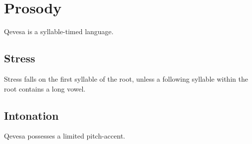\documentclass[grammar]{subfiles}
\begin{document}
  \section{Prosody}
  \label{sec:prosody}

  Qevesa is a syllable-timed language.
  \ToBeWritten

  \subsection{Stress}
  \label{ssec:stress}

  Stress falls on the first syllable of the root, unless a following syllable within the root contains a long vowel.  \ToBeWritten

  \subsection{Intonation}
  \label{ssec:intonation}

  Qevesa possesses a limited pitch-accent.
  \ToBeWritten
\end{document}
